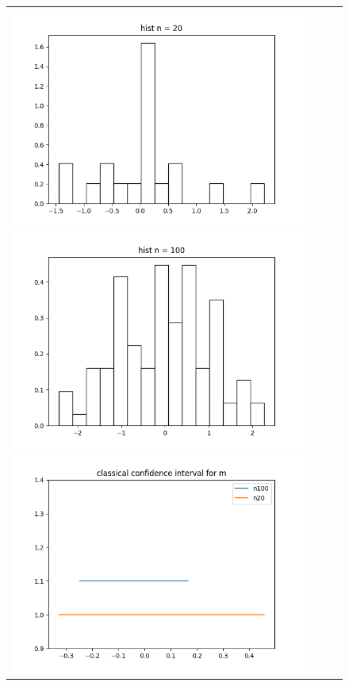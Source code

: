 \begin{figure}[H]
	\begin{tabular}{cccc}
		\includegraphics[scale=0.3]{hist_n_20.png}
		\includegraphics[scale=0.3]{hist_n_100.png}
		\includegraphics[scale=0.3]{classic_m.png}

\end{tabular}
\end{figure}
